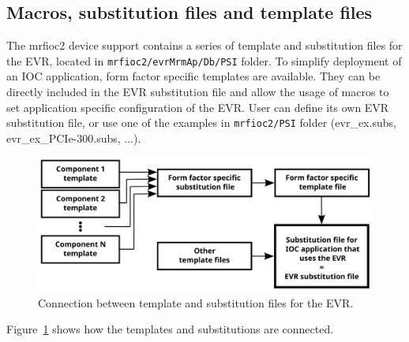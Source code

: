 \documentclass[12pt,a4paper]{article}
\begin{document}
\subsection{Macros, substitution files and template files}\label{sec:Macros}
The mrfioc2 device support contains a series of template and substitution files for the EVR, located in \texttt{mrfioc2/evrMrmAp/Db/PSI} folder. To simplify deployment of an IOC application, form factor specific templates are available. They can be directly included in the EVR substitution file and allow the usage of macros to set application specific configuration of the EVR. User can define its own EVR substitution file, or use one of the examples in \texttt{mrfioc2/PSI} folder (evr\_ex.subs, evr\_ex\_PCIe-300.subs, ...).
\begin{figure}[H]
	\centering
	\includegraphics[width=\columnwidth]{./img/templates}
	\caption{Connection between template and substitution files for the EVR.}
	\label{fig:templates}
\end{figure}
Figure~\ref{fig:templates} shows how the templates and substitutions are connected.
\end{document}
